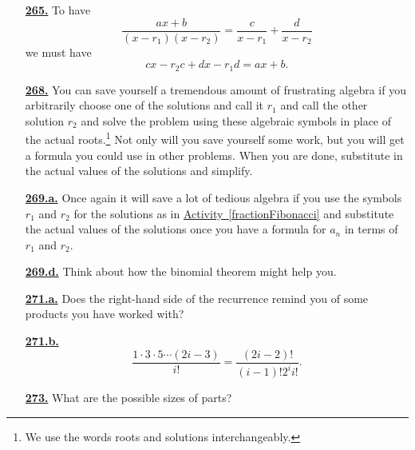 \documentclass[10pt,]{book}
\theoremstyle{plain}
\theoremstyle{definition}
\theoremstyle{definition}
\theoremstyle{definition}
\numberwithin{equation}{chapter}
\begin{document}
\begin{itemize}[itemsep=1em]
\hypertarget{a-265}{}\item[\textbf{\hyperref[partialfractions1]{265.}}]
\hypertarget{p-1363}{}%
To have%
\begin{equation*}
\frac{ax+b}{(x-r_1)(x-r_2)} = \frac{c}{x-r_1} + \frac{d}{x-r_2}
\end{equation*}
we must have%
\begin{equation*}
cx-r_2c+dx-r_1d =ax+b\text{.}
\end{equation*}
%

\hypertarget{a-268}{}\item[\textbf{\hyperref[fractionFibonacci]{268.}}]
\hypertarget{p-1371}{}%
You can save yourself a tremendous amount of frustrating algebra if you arbitrarily choose one of the solutions and call it \(r_1\) and call the other solution \(r_2\) and solve the problem using these algebraic symbols in place of the actual roots.\footnote{We use the words roots and solutions interchangeably.\label{fn-18}} Not only will you save yourself some work, but you will get a formula you could use in other problems. When you are done, substitute in the actual values of the solutions and simplify.%

\hypertarget{a-269.a}{}\item[\textbf{\hyperref[task-249]{269.a.}}]
\hypertarget{p-1374}{}%
Once again it will save a lot of tedious algebra if you use the symbols \(r_1\) and \(r_2\) for the solutions as in \hyperref[fractionFibonacci]{Activity~\ref{fractionFibonacci}} and substitute the actual values of the solutions once you have a formula for \(a_n\) in terms of \(r_1\) and \(r_2\).%

\hypertarget{a-269.d}{}\item[\textbf{\hyperref[task-252]{269.d.}}]
\hypertarget{p-1381}{}%
Think about how the binomial theorem might help you.%

\hypertarget{a-271.a}{}\item[\textbf{\hyperref[task-254]{271.a.}}]
\hypertarget{p-1389}{}%
Does the right-hand side of the recurrence remind you of some products you have worked with?%

\hypertarget{a-271.b}{}\item[\textbf{\hyperref[task-255]{271.b.}}]
\hypertarget{p-1392}{}%
%
\begin{equation*}
\frac{1\cdot 3\cdot 5\cdots (2i-3)}{i!} = \frac{(2i-2)!}{(i-1)!2^i i!}\text{.}
\end{equation*}
%

\hypertarget{a-273}{}\item[\textbf{\hyperref[activity-266]{273.}}]
\hypertarget{p-1401}{}%
What are the possible sizes of parts?%


\end{itemize}
\end{document}
